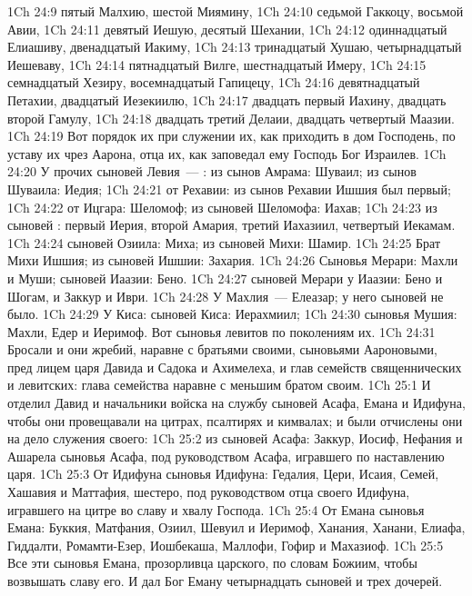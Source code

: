 \vs 1Ch 24:9 пятый Малхию, шестой Миямину,
\vs 1Ch 24:10 седьмой Гаккоцу, восьмой Авии,
\vs 1Ch 24:11 девятый Иешую, десятый Шехании,
\vs 1Ch 24:12 одиннадцатый Елиашиву, двенадцатый Иакиму,
\vs 1Ch 24:13 тринадцатый Хушаю, четырнадцатый Иешеваву,
\vs 1Ch 24:14 пятнадцатый Вилге, шестнадцатый Имеру,
\vs 1Ch 24:15 семнадцатый Хезиру, восемнадцатый Гапицецу,
\vs 1Ch 24:16 девятнадцатый Петахии, двадцатый Иезекиилю,
\vs 1Ch 24:17 двадцать первый Иахину, двадцать второй Гамулу,
\vs 1Ch 24:18 двадцать третий Делаии, двадцать четвертый Маазии.
\vs 1Ch 24:19 Вот порядок их при служении их, как  приходить в дом Господень, по уставу их чрез Аарона, отца их, как заповедал ему Господь Бог Израилев.
\rsbpar\vs 1Ch 24:20 У прочих сыновей Левия~--- : из сынов Амрама: Шуваил; из сынов Шуваила: Иедия;
\vs 1Ch 24:21 от Рехавии: из сынов Рехавии Ишшия был первый;
\vs 1Ch 24:22 от Ицгара: Шеломоф; из сыновей Шеломофа: Иахав;
\vs 1Ch 24:23 из сыновей : первый Иерия, второй Амария, третий Иахазиил, четвертый Иекамам.
\vs 1Ch 24:24  сыновей Озиила: Миха; из сыновей Михи: Шамир.
\vs 1Ch 24:25 Брат Михи Ишшия; из сыновей Ишшии: Захария.
\vs 1Ch 24:26 Сыновья Мерари: Махли и Муши;  сыновей Иаазии: Бено.
\vs 1Ch 24:27  сыновей Мерари у Иаазии: Бено и Шогам, и Заккур и Иври.
\vs 1Ch 24:28 У Махлия~--- Елеазар; у него сыновей не было.
\vs 1Ch 24:29 У Киса:  сыновей Киса: Иерахмиил;
\vs 1Ch 24:30 сыновья Мушия: Махли, Едер и Иеримоф. Вот сыновья левитов по поколениям их.
\vs 1Ch 24:31 Бросали и они жребий, наравне с братьями своими, сыновьями Аароновыми, пред лицем царя Давида и Садока и Ахимелеха, и глав семейств священнических и левитских: глава семейства наравне с меньшим братом своим.
\vs 1Ch 25:1 И отделил Давид и начальники войска на службу сыновей Асафа, Емана и Идифуна, чтобы они провещавали на цитрах, псалтирях и кимвалах; и были отчислены они на дело служения своего:
\vs 1Ch 25:2 из сыновей Асафа: Заккур, Иосиф, Нефания и Ашарела сыновья Асафа, под руководством Асафа, игравшего по наставлению царя.
\vs 1Ch 25:3 От Идифуна сыновья Идифуна: Гедалия, Цери, Исаия, Семей, Хашавия и Маттафия, шестеро, под руководством отца своего Идифуна, игравшего на цитре во славу и хвалу Господа.
\vs 1Ch 25:4 От Емана сыновья Емана: Буккия, Матфания, Озиил, Шевуил и Иеримоф, Ханания, Ханани, Елиафа, Гиддалти, Ромамти-Езер, Иошбекаша, Маллофи, Гофир и Махазиоф.
\vs 1Ch 25:5 Все эти сыновья Емана, прозорливца царского, по словам Божиим, чтобы возвышать славу его. И дал Бог Еману четырнадцать сыновей и трех дочерей.
